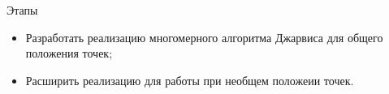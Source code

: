 \documentclass[]{beamer} %
\begin{document}
\begin{frame}{Этапы}
       \begin{itemize}
        \item  Разработать реализацию многомерного алгоритма Джарвиса для общего положения точек;
        \item Расширить реализацию для работы при необщем положеии точек.
        \end{itemize}
\end{frame}



\end{document}
